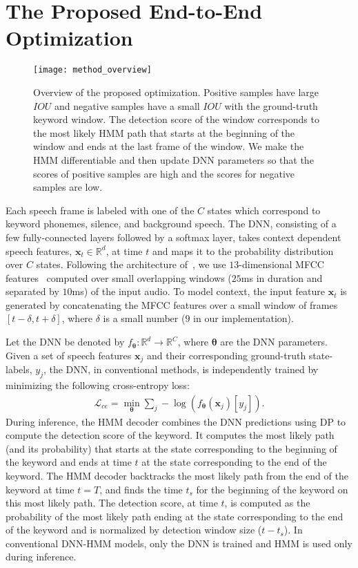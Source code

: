 \documentclass{article}
\begin{document}
\section{The Proposed End-to-End Optimization}
\begin{figure}[t]
    \centering
    \texttt{[image: method\_overview]} \\
    \vspace{-0.1in}
    \caption{Overview of the proposed optimization. Positive samples have large $IOU$ and negative samples have a small $IOU$ with the  ground-truth keyword window.
The detection score of the window corresponds to the most likely HMM path that starts at the beginning of the window and ends at the last frame of the window.
    We make the HMM differentiable and then update DNN parameters so that the scores of positive samples are high and the scores for negative samples are low.}
    \label{fig:method_overview}
\end{figure}

Each speech frame is labeled with one of the $C$ states which correspond to keyword phonemes, silence, and background speech. The DNN, consisting of a few fully-connected layers followed by a softmax layer, takes context dependent speech features, $\boldsymbol x_t \in \mathbb R^{d}$, at time $t$ and maps it to the probability distribution over $C$ states.
Following the architecture of~\cite{SigtiaHRMB18}, we use $13$-dimensional MFCC features~\cite{Mermelstein1976DistanceMF, Davis80comparisonof} computed over small overlapping windows ($25$ms in duration and separated by $10$ms) of the input audio.
To model context, the input feature $\boldsymbol x_t$ is generated by concatenating the MFCC features over a small window of frames $[t-\delta, t+\delta]$, where $\delta$ is a small number ($9$ in our implementation).

Let the DNN be denoted by $f_{\boldsymbol \theta}: \mathbb R^d \rightarrow \mathbb R^C$, where $\boldsymbol \theta$ are the DNN parameters.
Given a set of speech features $\boldsymbol x_j$
and their corresponding ground-truth state-labels, $y_j$, the DNN, in conventional methods, is independently trained by minimizing the following cross-entropy loss:
\begin{align}
\mathcal L_{ce} = \min_{\boldsymbol \theta} \sum_{j} -\log(f_{\boldsymbol \theta}(\boldsymbol x_j)[y_j]).
\label{eq:loss_ce}
\end{align}
During inference, the HMM decoder combines the DNN predictions using DP to compute the detection score of the keyword.
It computes the most likely path (and its probability) that starts at the state corresponding to the beginning of the keyword and ends at time $t$ at the state corresponding to the end of the keyword.
The HMM decoder backtracks the most likely path from the end of the keyword at time $t=T$, and finds the time $t_s$ for the beginning of the keyword on this most likely path.
The detection score, at time $t$, is computed as the probability of the most likely path ending at the state corresponding to the end of the keyword and is normalized by detection window size ($t - t_s$).
In conventional DNN-HMM models, only the DNN is trained and HMM is used only during inference.
\end{document}
